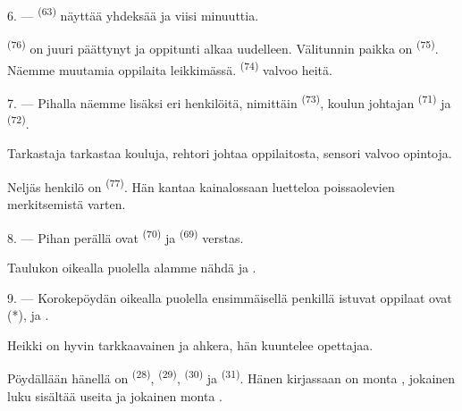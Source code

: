 6. ---  \textsuperscript{(63)} näyttää yhdeksää ja viisi
minuuttia.

 \textsuperscript{(76)} on juuri päättynyt ja oppitunti alkaa
uudelleen. Välitunnin paikka on  \textsuperscript{(75)}.
Näemme muutamia oppilaita leikkimässä. 
\textsuperscript{(74)} valvoo heitä.

7. --- Pihalla näemme lisäksi eri henkilöitä, nimittäin 
\textsuperscript{(73)}, koulun johtajan 
\textsuperscript{(71)} ja  \textsuperscript{(72)}.

Tarkastaja tarkastaa kouluja, rehtori johtaa oppilaitosta, sensori valvoo
opintoja.

Neljäs henkilö on  \textsuperscript{(77)}. Hän kantaa
kainalossaan luetteloa poissaolevien merkitsemistä varten.

8. --- Pihan perällä ovat  \textsuperscript{(70)} ja
 \textsuperscript{(69)} verstas.

Taulukon oikealla puolella alamme nähdä  ja
 .


\VUsaut{2.4mm}

\VUsaut{3.0mm}

9. --- Korokepöydän oikealla puolella ensimmäisellä penkillä istuvat oppilaat
ovat  (*),  ja .

Heikki on hyvin tarkkaavainen ja ahkera, hän kuuntelee opettajaa.

Pöydällään hänellä on  \textsuperscript{(28)}, 
\textsuperscript{(29)},  \textsuperscript{(30)} ja
 \textsuperscript{(31)}. Hänen kirjassaan on monta
, jokainen luku sisältää useita  ja jokainen
 monta .

